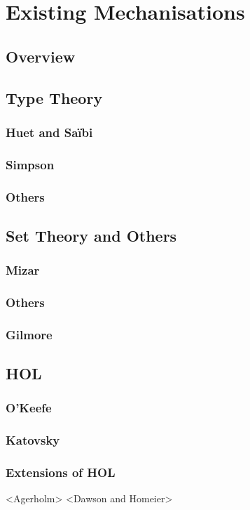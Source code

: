 \documentclass{article}
\begin{document}
\section{Existing Mechanisations}
\subsection{Overview}
\subsection{Type Theory}
\subsubsection{Huet and Sa{\"i}bi}
\subsubsection{Simpson}
\subsubsection{Others}
\subsection{Set Theory and Others}
\subsubsection{Mizar}
\subsubsection{Others}
\subsubsection{Gilmore}
\subsection{HOL}
\subsubsection{O'Keefe}
\subsubsection{Katovsky}
\subsubsection{Extensions of HOL}
<Agerholm>
<Dawson and Homeier>
\end{document}
